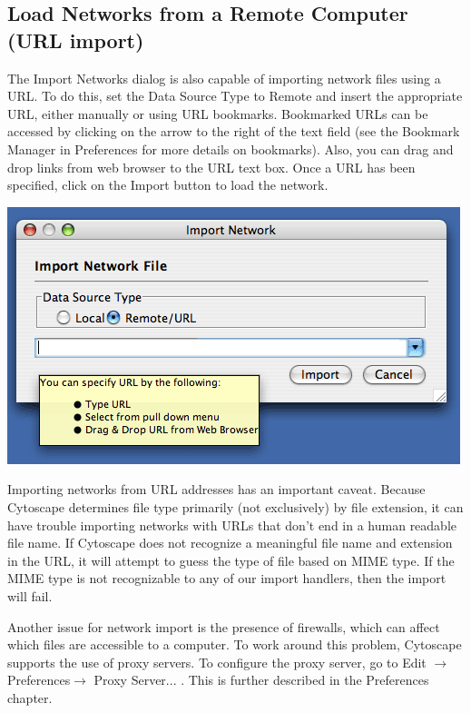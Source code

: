 \subsection{Load Networks from a Remote Computer (URL import)}
 The Import Networks dialog is also capable of importing network files using a URL. To do this, set the Data Source Type to Remote and insert the appropriate URL, either manually or using URL bookmarks. Bookmarked URLs can be accessed by clicking on the arrow to the right of the text field (see the Bookmark Manager in Preferences for more details on bookmarks). Also, you can drag and drop links from web browser to the URL text box. Once a URL has been specified, click on the Import button to load the network. 

\begin{center}
 \includegraphics[wdith=\textwidth]{images/network_import_dialog2_25.png} 
\end{center}

 Importing networks from URL addresses has an important caveat. Because Cytoscape determines file type primarily (not exclusively) by file extension, it can have trouble importing networks with URLs that don't end in a human readable file name. If Cytoscape does not recognize a meaningful file name and extension in the URL, it will attempt to guess the type of file based on MIME type. If the MIME type is not recognizable to any of our import handlers, then the import will fail. 

 Another issue for network import is the presence of firewalls, which can affect which files are accessible to a computer. To work around this problem, Cytoscape supports the use of proxy servers. To configure the proxy server, go to Edit $\rightarrow$ Preferences$\rightarrow$ Proxy Server... . This is further described in the Preferences chapter. 

